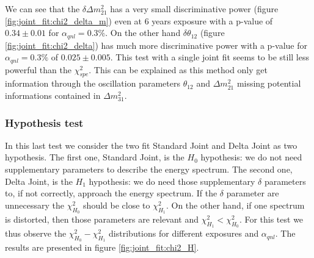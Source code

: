 \documentclass[../main.tex]{subfiles}
\begin{document}
We can see that the $\delta \Delta m^2_{21}$ has a very small discriminative power (figure \ref{fig:joint_fit:chi2_delta_m}) even at 6 years exposure with a p-value of $0.34 \pm 0.01$ for $\alpha_{qnl} = 0.3\%$. On the other hand $\delta \theta_{12}$ (figure \ref{fig:joint_fit:chi2_delta}) has much more discriminative power with a p-value for $\alpha_{qnl} = 0.3\%$ of $0.025 \pm 0.005$. This test with a single joint fit seems to be still less powerful than the $\chi^2_{spe}$. This can be explained as this method only get information through the oscillation parameters $\theta_{12}$ and $\Delta m^2_{21}$ missing potential informations contained in $\Delta m^2_{31}$.

\subsubsection{Hypothesis test}

In this last test we consider the two fit Standard Joint and Delta Joint as two hypothesis. The first one, Standard Joint, is the $H_0$ hypothesis: we do not need supplementary parameters to describe the energy spectrum. The second one, Delta Joint, is the $H_1$ hypothesis: we do need those supplementary $\delta$ parameters to, if not correctly, approach the energy spectrum. If the $\delta$ parameter are unnecessary the $\chi^2_{H_0}$ should be close to $\chi^2_{H_1}$. On the other hand, if one spectrum is distorted, then those parameters are relevant and $\chi^2_{H_1} < \chi^2_{H_0}$. For this test we thus observe the $\chi^2_{H_0} - \chi^2_{H_1}$ distributions for different exposures and $\alpha_{qnl}$. The results are presented in figure \ref{fig:joint_fit:chi2_H}.
\end{document}
